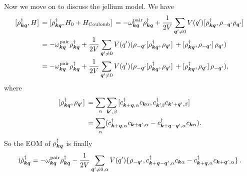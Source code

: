 \documentclass[hyperref, a4paper]{article}
\newcommand*{\ii}{\mathrm{i}}
\begin{document}
Now we move on to discuss the jellium model. We have 
\[
    \begin{aligned}
        \comm*{\rho^\dagger_{\vb*{k} \vb*{q}}}{H} &= \comm*{\rho^\dagger_{\vb*{k} \vb*{q}}}{H_0 + H_\text{Coulomb}} = 
        - \omega^\text{pair}_{\vb*{k} \vb*{q}} {\rho}^\dagger_{\vb*{k} \vb*{q}} + \frac{1}{2V} \sum_{\vb*{q}' \neq 0} V(q') \comm*{\rho_{\vb*{k} \vb*{q}}^\dagger}{\rho_{-\vb*{q}'} \rho_{\vb*{q}'}} \\
        &= - \omega^\text{pair}_{\vb*{k} \vb*{q}} {\rho}^\dagger_{\vb*{k} \vb*{q}} + \frac{1}{2V} \sum_{\vb*{q}' \neq 0} V(q') (\rho_{-\vb*{q}'} \comm*{\rho_{\vb*{k} \vb*{q}}^\dagger}{ \rho_{\vb*{q}'}} + \comm*{\rho_{\vb*{k} \vb*{q}}^\dagger}{ \rho_{-\vb*{q}'}} \rho_{\vb*{q}'} ) \\
        &= - \omega^\text{pair}_{\vb*{k} \vb*{q}} {\rho}^\dagger_{\vb*{k} \vb*{q}} + \frac{1}{2V} \sum_{\vb*{q}' \neq 0} V(q') (\rho_{-\vb*{q}'} \comm*{\rho_{\vb*{k} \vb*{q}}^\dagger}{ \rho_{\vb*{q}'}} + \comm*{\rho_{\vb*{k} \vb*{q}}^\dagger}{ \rho_{\vb*{q}'}} \rho_{-\vb*{q}'} ) ,
    \end{aligned}
\] 
where 
\[
    \begin{aligned}
        \comm*{\rho_{\vb*{k} \vb*{q}}^\dagger}{ \rho_{\vb*{q}'}} &= 
        \sum_{\alpha} \sum_{\vb*{k}', \beta} \comm*{c_{\vb*{k}+\vb*{q}, \alpha}^\dagger c_{\vb*{k} \alpha}}{c^\dagger_{\vb*{k}' \beta} c_{\vb*{k}' + \vb*{q}', \beta}} \\
        &= \sum_{\alpha} ( c^\dagger_{\vb*{k} + \vb*{q}, \alpha} c_{\vb*{k} + \vb*{q}', \alpha} - c^\dagger_{\vb*{k} + \vb*{q} - \vb*{q}' , \alpha} c_{\vb*{k} \alpha} ).
    \end{aligned}
\]
So the EOM of $\rho_{\vb*{k} \vb*{q}}^\dagger$ is finally  
\begin{equation}
    \ii \dot{\rho}_{\vb*{k} \vb*{q}}^\dagger = - \omega^\text{pair}_{\vb*{k} \vb*{q}} {\rho}^\dagger_{\vb*{k} \vb*{q}} - \frac{1}{2V} \sum_{\vb*{q}' \neq 0, \alpha} V(q') \acomm*{\rho_{-\vb*{q}'}}{c^\dagger_{\vb*{k} + \vb*{q} - \vb*{q}' , \alpha} c_{\vb*{k} \alpha} - c^\dagger_{\vb*{k} + \vb*{q}, \alpha} c_{\vb*{k} + \vb*{q}', \alpha}}.
    \label{eq:bosonic-eq}
\end{equation}
\end{document}
